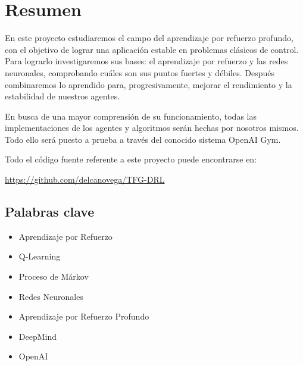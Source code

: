\chapter*{Resumen}

En este proyecto estudiaremos el campo del aprendizaje por refuerzo profundo, con el objetivo de lograr una aplicación estable en problemas clásicos de control. Para lograrlo investigaremos sus bases: el aprendizaje por refuerzo y las redes neuronales, comprobando cuáles son sus puntos fuertes y débiles. Después combinaremos lo aprendido para, progresivamente, mejorar el rendimiento y la estabilidad de nuestros agentes.

En busca de una mayor comprensión de su funcionamiento, todas las implementaciones de los agentes y algoritmos serán hechas por nosotros mismos. Todo ello será puesto a prueba a través del conocido sistema OpenAI Gym.

Todo el código fuente referente a este proyecto puede encontrarse en:

\url{https://github.com/delcanovega/TFG-DRL}

\section*{Palabras clave}
   
\begin{itemize}
    \item Aprendizaje por Refuerzo
    \item Q-Learning
    \item Proceso de Márkov
    \item Redes Neuronales
    \item Aprendizaje por Refuerzo Profundo
    \item DeepMind 
    \item OpenAI
\end{itemize}